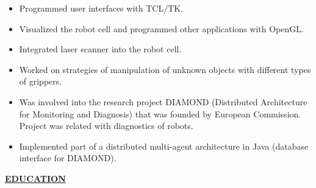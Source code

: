 \documentclass[a4paper,12pt,]{article}
\begin{document}
\begin{description}
\begin{itemize}
    \item Programmed user interfaces with TCL/TK.

    \item Visualized the robot cell and programmed other applications with OpenGL.

    \item Integrated laser scanner into the robot cell.

    \item Worked on strategies of manipulation of unknown objects with different types
      of grippers.

    \item Was involved into the research project DIAMOND (Distributed Architecture for 
      Monitoring and Diagnosis) that was
      founded by European Commission. Project was related with diagnostics of robots.

    \item Implemented part of a distributed multi-agent architecture in Java (database 
      interface for DIAMOND).

    \end{itemize}

  \end{description}

  \vspace{1ex}

  \uline{ \bfseries{EDUCATION} }
\end{document}
